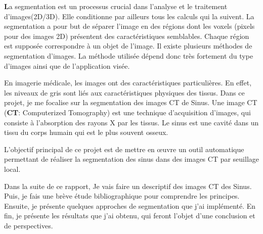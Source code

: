 \par\hspace{0.5cm} \lettrine[lines=2]{\textbf{L}} {}a segmentation est un processus crucial dans l'analyse et le traitement d'images(2D/3D). Elle conditionne par ailleurs tous les calculs qui la suivent. La segmentation a pour but de séparer l'image en des régions dont les voxels (pixels pour des images 2D) présentent des caractéristiques semblables. Chaque région est supposée correspondre à un objet de l'image. Il existe plusieurs méthodes de segmentation d'images. La méthode utilisée dépend donc très fortement du type d'images ainsi que de l'application visée.

En imagerie médicale, les images ont des caractéristiques particulières. En effet, les niveaux de gris sont liés aux caractéristiques physiques des tissus.
Dans ce projet, je me focalise sur la segmentation des images CT de Sinus. Une image CT (\textbf{CT}: Computerized Tomography) est une technique d'acquisition d'images, qui consiste à l'absorption des rayons X par les tissus. Le sinus est une cavité dans un tissu du corps humain qui est le plus souvent osseux.

L'objectif principal de ce projet est de mettre en œuvre un outil automatique permettant de réaliser la segmentation des sinus dans des images CT par seuillage local.

Dans la suite de ce rapport, Je vais faire un descriptif des images CT des Sinus. Puis, je fais une brève étude bibliographique pour comprendre les principes. Ensuite, je présente quelques approches de segmentation que j'ai implémenté. En fin, je présente les résultats que j'ai obtenu, qui feront l'objet d'une conclusion et de perspectives.